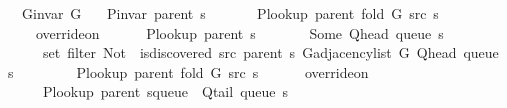 \begin{isabellebody}
\ \ \ {\isachardoublequoteopen}G{\isachardot}{\kern0pt}invar\ G{\isachardoublequoteclose}\isanewline
\ \ \ {\isachardoublequoteopen}P{\isacharunderscore}{\kern0pt}invar\ {\isacharparenleft}{\kern0pt}parent\ s{\isacharparenright}{\kern0pt}{\isachardoublequoteclose}\isanewline
\ \ \isanewline
\ \ \ \ {\isachardoublequoteopen}P{\isacharunderscore}{\kern0pt}lookup\ {\isacharparenleft}{\kern0pt}parent\ {\isacharparenleft}{\kern0pt}fold\ G\ src\ s{\isacharparenright}{\kern0pt}{\isacharparenright}{\kern0pt}\ {\isacharequal}{\kern0pt}\isanewline
\ \ \ \ \ override{\isacharunderscore}{\kern0pt}on\isanewline
\ \ \ \ \ \ {\isacharparenleft}{\kern0pt}P{\isacharunderscore}{\kern0pt}lookup\ {\isacharparenleft}{\kern0pt}parent\ s{\isacharparenright}{\kern0pt}{\isacharparenright}{\kern0pt}\isanewline
\ \ \ \ \ \ {\isacharparenleft}{\kern0pt}{\isasymlambda}{\isacharunderscore}{\kern0pt}{\isachardot}{\kern0pt}\ Some\ {\isacharparenleft}{\kern0pt}Q{\isacharunderscore}{\kern0pt}head\ {\isacharparenleft}{\kern0pt}queue\ s{\isacharparenright}{\kern0pt}{\isacharparenright}{\kern0pt}{\isacharparenright}{\kern0pt}\isanewline
\ \ \ \ \ \ {\isacharparenleft}{\kern0pt}set\ {\isacharparenleft}{\kern0pt}filter\ {\isacharparenleft}{\kern0pt}Not\ {\isasymcirc}\ is{\isacharunderscore}{\kern0pt}discovered\ src\ {\isacharparenleft}{\kern0pt}parent\ s{\isacharparenright}{\kern0pt}{\isacharparenright}{\kern0pt}\ {\isacharparenleft}{\kern0pt}G{\isachardot}{\kern0pt}adjacency{\isacharunderscore}{\kern0pt}list\ G\ {\isacharparenleft}{\kern0pt}Q{\isacharunderscore}{\kern0pt}head\ {\isacharparenleft}{\kern0pt}queue\ s{\isacharparenright}{\kern0pt}{\isacharparenright}{\kern0pt}{\isacharparenright}{\kern0pt}{\isacharparenright}{\kern0pt}{\isacharparenright}{\kern0pt}{\isachardoublequoteclose}\isanewline
%
\isadelimproof
%
\endisadelimproof
%
\isatagproof
{}\isamarkupfalse%
\ {\isacharminus}{\kern0pt}\isanewline
\ \ \isamarkupfalse%
\isanewline
\ \ \ \ {\isachardoublequoteopen}P{\isacharunderscore}{\kern0pt}lookup\ {\isacharparenleft}{\kern0pt}parent\ {\isacharparenleft}{\kern0pt}fold\ G\ src\ s{\isacharparenright}{\kern0pt}{\isacharparenright}{\kern0pt}\ {\isacharequal}{\kern0pt}\isanewline
\ \ \ \ \ override{\isacharunderscore}{\kern0pt}on\isanewline
\ \ \ \ \ \ {\isacharparenleft}{\kern0pt}P{\isacharunderscore}{\kern0pt}lookup\ {\isacharparenleft}{\kern0pt}parent\ {\isacharparenleft}{\kern0pt}s{\isasymlparr}queue\ {\isacharcolon}{\kern0pt}{\isacharequal}{\kern0pt}\ Q{\isacharunderscore}{\kern0pt}tail\ {\isacharparenleft}{\kern0pt}queue\ s{\isacharparenright}{\kern0pt}{\isasymrparr}{\isacharparenright}{\kern0pt}{\isacharparenright}{\kern0pt}{\isacharparenright}{\kern0pt}\isanewline

\end{isabellebody}
